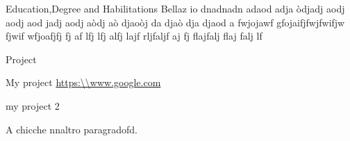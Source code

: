 \documentclass[a4paper,11pt,noweblinkbox=true]{dmCV}
\begin{document}
\address{Via Prenestina 226}
\personaldata
\begin{eventlist}{Education,Degree and Habilitations}
  Bellaz io dnadnadn adaod adja òdjadj aodj aodj aod
   jadj aodj aòdj aò djaoòj da djaò dja djaod a
  fwjojawf gfojaifjfwjfwifjw fjwif wfjoafjfj fj af
    lfj lfj alfj lajf rljfaljf aj fj flajfalj flaj falj lf
\end{eventlist}

\begin{eventlist}{Project}
  \item My project \small{\url{https:\\www.google.com}}
  \item my project 2
\end{eventlist}
A chicche nnaltro paragradofd.
\end{document}
